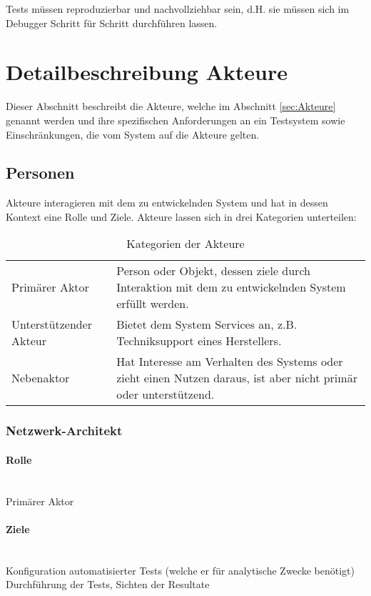 \documentclass[
	ngerman,
	toc=listof, %
	toc=bibliography, %
	footnotes=multiple, %
	parskip=half, %
	numbers=noendperiod %
]{scrartcl}
\begin{document}
		Tests müssen reproduzierbar und nachvollziehbar sein, d.H. sie müssen sich im Debugger Schritt für Schritt durchführen lassen.
			
\section{Detailbeschreibung Akteure}
Dieser Abschnitt beschreibt die Akteure, welche im Abschnitt \ref{sec:Akteure} genannt werden und ihre spezifischen Anforderungen an ein Testsystem sowie Einschränkungen, die vom System auf die Akteure gelten.
	
	\subsection{Personen}
	Akteure interagieren mit dem zu entwickelnden System und hat in dessen Kontext eine Rolle und Ziele.
	Akteure lassen sich in drei Kategorien unterteilen: 
		
	\begin{table}[!h]
		\begin{tabularx}{\textwidth}{lX}
			\toprule
				Primärer Aktor & Person oder Objekt, dessen ziele durch Interaktion mit dem zu entwickelnden System erfüllt werden.\\
				Unterstützender Akteur & Bietet dem System Services an, z.B. Techniksupport eines Herstellers.\\
				Nebenaktor & Hat Interesse am Verhalten des Systems oder zieht einen Nutzen daraus, ist aber nicht primär oder unterstützend. \\
			\bottomrule
		\end{tabularx}
		\caption{Kategorien der Akteure}
	\end{table}

		\subsubsection{Netzwerk-Architekt}
		
			\paragraph{Rolle} ~\\
			Primärer Aktor 

			\paragraph{Ziele} ~\\ 
			Konfiguration automatisierter Tests (welche er für analytische Zwecke benötigt) 
			Durchführung der Tests, 
			Sichten der Resultate
			
\end{document}
